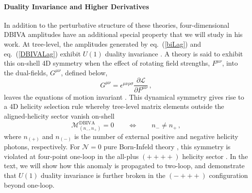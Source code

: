 \documentclass[11pt,letter]{article}
\def\eqn#1{eq.~(\ref{#1})}
\begin{document}
\paragraph{Duality Invariance and Higher Derivatives}
In addition to the perturbative structure of these theories, four-dimensional DBIVA amplitudes have an additional special property that we will study in his work. At tree-level, the amplitudes generated by \eqn{biLag} and \eqn{DBIVALag} exhibit $U(1)$ {duality invariance} \cite{Bossard:2012xs,Novotny:2018iph}. A theory is said to exhibit this on-shell 4D symmetry when the effect of rotating field strengths, $F^{\mu\nu}$, into the dual-fields, $G^{\mu\nu}$, defined below,
\begin{equation}
G^{\mu\nu} = \epsilon^{\mu\nu\rho\sigma}\frac{\partial \mathcal{L}}{\partial F^{\mu\nu}}\,,
\end{equation}
leaves the equations of motion invariant \cite{Gibbons:1995ap,Babaei-Aghbolagh:2013hia}. This dynamical symmetry gives rise to a 4D helicity selection rule \cite{Novotny:2018iph} whereby tree-level matrix elements outside the aligned-helicity sector vanish on-shell
\begin{equation}
\mathcal{M}^{\text{DBIVA}}_{(n_{-}, n_{+})} =0 \qquad \Leftrightarrow \qquad n_{-}\neq n_{+}\,,
\end{equation}
where $n_{(+)}$ and $n_{(-)}$ is the number of external positive and negative helicity photons, respectively. For $\mathcal{N}=0$ pure Born-Infeld theory \cite{Born:1934gh,Schrodinger:1935oqa}, this symmetry is violated at four-point one-loop in the all-plus $(++++)$ helicity sector \cite{Elvang:2019twd}. In the text, we will show how this anomaly is propagated to two-loop, and demonstrate that $U(1)$ duality invariance is further broken in the $(-+++)$ configuration beyond one-loop. 
\end{document}
